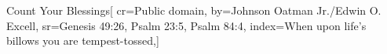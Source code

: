 {Count Your Blessings}[
    cr={Public domain},
    by={Johnson Oatman Jr./Edwin O. Excell},
    sr={Genesis 49:26, Psalm 23:5, Psalm 84:4},
    index={When upon life’s billows you are tempest-tossed,}]

